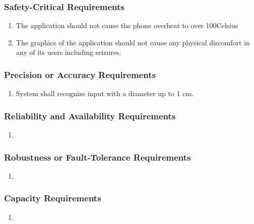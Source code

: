 \documentclass[]{article}
\begin{document}
\subsubsection{Safety-Critical Requirements}
\label{ssub:safety_critical_requirements}
\begin{enumerate}[{PR}1. ]
	\item The application should not cause the phone overheat to over 100\degree Celsius
	\item The graphics of the application should not cause any physical discomfort in any of its users including seizures. 
\end{enumerate}

\subsubsection{Precision or Accuracy Requirements}
\label{ssub:precision_or_accuracy_requirements}
\begin{enumerate}[{PR}1. ]
	\item System shall recognize input with a diameter up to 1 cm. 
\end{enumerate}

\subsubsection{Reliability and Availability Requirements}
\label{ssub:reliability_and_availability_requirements}
\begin{enumerate}[{PR}1. ]
	\item 
\end{enumerate}

\subsubsection{Robustness or Fault-Tolerance Requirements}
\label{ssub:robustness_or_fault_tolerance_requirements}
\begin{enumerate}[{PR}1. ]
	\item 
\end{enumerate}

\subsubsection{Capacity Requirements}
\label{ssub:capacity_requirements}
\begin{enumerate}[{PR}1. ]
	\item 
\end{enumerate}
\end{document}
